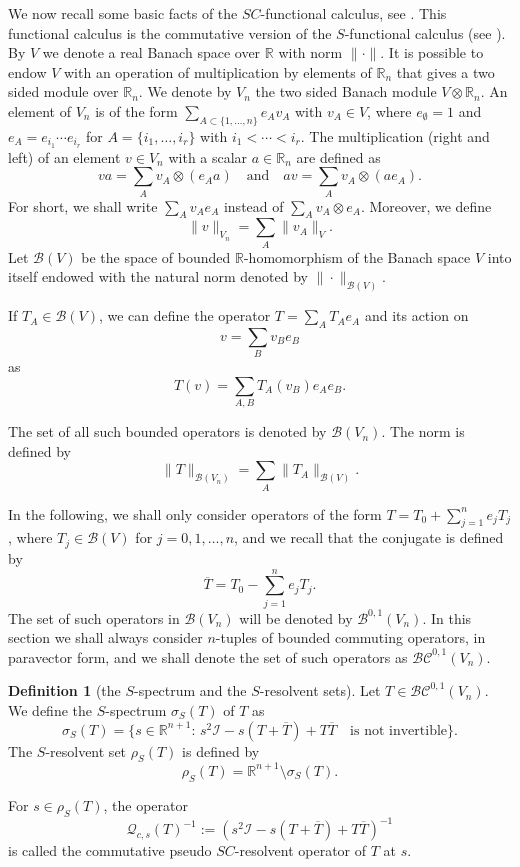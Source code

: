 \documentclass[reqno,11pt]{amsart}
\numberwithin{equation}{section}
\theoremstyle{definition}
\newtheorem{definition}[theorem]{Definition}
\newcommand{\rr}{\mathbb{R}}
\begin{document}
We now recall some basic facts of the $SC$-functional calculus, see \cite{CS}. This functional calculus is the commutative version of the $S$-functional calculus (see \cite{CGKBOOK}). By $V$ we denote a real Banach space over $\rr$ with norm $\|\cdot\|$. It is possible to endow $V$ with an operation of multiplication by elements of $\rr_n$ that gives a two sided module over $\rr_n$. We denote by $V_n$ the two sided Banach module $V\otimes \rr_n$. An element of $V_n$ is of the form $\sum_{A\subset\{1,\ldots, n\}}e_A v_A$ with $v_A\in V$, where $e_\emptyset =1$ and $e_A=e_{i_1}\cdots e_{i_r}$ for $A=\{i_1,\ldots, i_r\}$ with $i_1<\cdots<i_r$. The multiplication (right and left) of an element $v\in V_n$ with a scalar $a\in\rr_n$ are defined as
$$ va=\sum_A v_A\otimes(e_A a)\quad\textrm{and}\quad av=\sum_A v_A\otimes (ae_A).$$
For short, we shall write $\sum_A v_Ae_A$ instead of $\sum_A v_A\otimes e_A$. Moreover, we define
$$\|v\|_{V_n}=\sum_A\|v_A\|_V.$$
Let $\mathcal B(V)$ be the space of bounded $\rr$-homomorphism of the Banach space $V$ into itself endowed with the natural norm denoted by $\|\cdot\|_{\mathcal B(V)}$.

If $T_A\in\mathcal B(V)$, we can define the operator $T=\sum_AT_A e_A$ and its action on
$$ v=\sum_{B}v_Be_B $$
as
$$ T(v)=\sum_{A,B} T_A(v_B)e_Ae_B.$$

The set of all such bounded operators is denoted by $\mathcal B(V_n)$. The norm is defined by
$$ \|T\|_{\mathcal B(V_n)}=\sum_A\|T_A\|_{\mathcal B(V)}. $$

In the following, we shall only consider operators of the form $T=T_0+\sum_{j=1}^ne_jT_j$, where $T_j\in\mathcal B(V)$ for $j=0,1,\ldots, n$, and we recall that the conjugate is defined by
$$\overline T=T_0-\sum_{j=1}^ne_j T_j.$$
The set of such operators in $\mathcal B(V_n)$ will be denoted by $\mathcal B^{0,1}(V_n)$. In this section we shall always consider $n$-tuples of bounded commuting operators, in paravector form, and we shall denote the set of such operators as $\mathcal{BC}^{0,1}(V_n)$.

\begin{definition}[the $S$-spectrum and the $S$-resolvent sets]
	Let $T\in \mathcal {BC}^{0,1}(V_n)$. We define the $S$-spectrum $\sigma_S(T)$ of $T$ as
	$$ \sigma_S(T)=\{s\in\rr^{n+1}:\, s^2\mathcal I -s(T+\overline T)+T\overline T\quad\textrm{is not invertible}\}. $$
	The $S$-resolvent set $\rho_S(T)$ is defined by
	$$ \rho_S(T)=\rr^{n+1}\setminus \sigma_S(T). $$
\end{definition}
For $s\in\rho_S(T)$, the operator
\begin{equation}\label{PSERES}
\mathcal Q_{c,s}(T)^{-1}:=(s^2\mathcal I-s(T+\overline T)+T\overline T)^{-1}
\end{equation}
is called the commutative pseudo $SC$-resolvent operator of $T$ at $s$.
\end{document}
